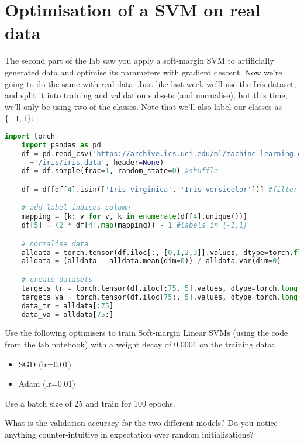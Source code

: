 \documentclass[a4paper]{article}
\begin{document}
\section{Optimisation of a SVM on real data}\label{SVM}
The second part of the lab saw you apply a soft-margin SVM to artificially generated data and optimise its parameters with gradient descent. Now we're going to do the same with real data. Just like last week we'll use the Iris dataset, and split it into training and validation subsets (and normalise), but this time, we'll only be using two of the classes. Note that we'll also label our classes as $\{-1,1\}$:

\begin{lstlisting}[language=Python]
	import torch
	import pandas as pd
	df = pd.read_csv('https://archive.ics.uci.edu/ml/machine-learning-databases'
	  +'/iris/iris.data', header=None)
	df = df.sample(frac=1, random_state=0) #shuffle

	df = df[df[4].isin(['Iris-virginica', 'Iris-versicolor'])] #filter

	# add label indices column
	mapping = {k: v for v, k in enumerate(df[4].unique())}  
	df[5] = (2 * df[4].map(mapping)) - 1 #labels in {-1,1}

	# normalise data
	alldata = torch.tensor(df.iloc[:, [0,1,2,3]].values, dtype=torch.float)
	alldata = (alldata - alldata.mean(dim=0)) / alldata.var(dim=0)

	# create datasets
	targets_tr = torch.tensor(df.iloc[:75, 5].values, dtype=torch.long)
	targets_va = torch.tensor(df.iloc[75:, 5].values, dtype=torch.long)
	data_tr = alldata[:75]
	data_va = alldata[75:]
\end{lstlisting}

\begin{tcolorbox}[title=2.1 Iris SVM (2 marks)]
Use the following optimisers to train Soft-margin Linear SVMs (using the code from the lab notebook) with a weight decay of $0.0001$ on the training data: 
\begin{itemize}
	\item SGD (lr=0.01)
	\item Adam (lr=0.01)
\end{itemize}
Use a batch size of 25 and train for 100 epochs.

What is the validation accuracy for the two different models? Do you notice anything counter-intuitive in expectation over random initialisations?
\end{tcolorbox}
\end{document}

